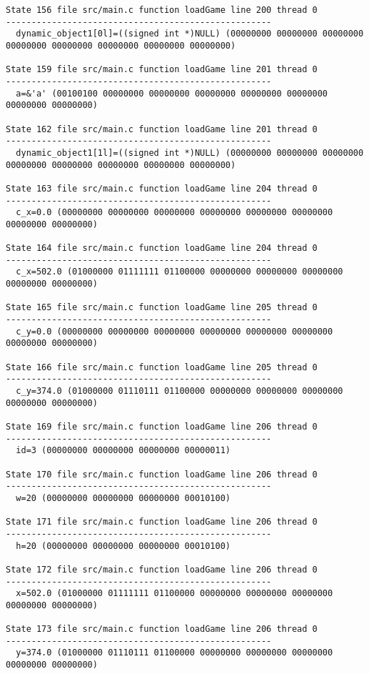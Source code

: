 \begin{verbatim}
State 156 file src/main.c function loadGame line 200 thread 0
----------------------------------------------------
  dynamic_object1[0l]=((signed int *)NULL) (00000000 00000000 00000000 00000000 00000000 00000000 00000000 00000000)

State 159 file src/main.c function loadGame line 201 thread 0
----------------------------------------------------
  a=&'a' (00100100 00000000 00000000 00000000 00000000 00000000 00000000 00000000)

State 162 file src/main.c function loadGame line 201 thread 0
----------------------------------------------------
  dynamic_object1[1l]=((signed int *)NULL) (00000000 00000000 00000000 00000000 00000000 00000000 00000000 00000000)

State 163 file src/main.c function loadGame line 204 thread 0
----------------------------------------------------
  c_x=0.0 (00000000 00000000 00000000 00000000 00000000 00000000 00000000 00000000)

State 164 file src/main.c function loadGame line 204 thread 0
----------------------------------------------------
  c_x=502.0 (01000000 01111111 01100000 00000000 00000000 00000000 00000000 00000000)

State 165 file src/main.c function loadGame line 205 thread 0
----------------------------------------------------
  c_y=0.0 (00000000 00000000 00000000 00000000 00000000 00000000 00000000 00000000)

State 166 file src/main.c function loadGame line 205 thread 0
----------------------------------------------------
  c_y=374.0 (01000000 01110111 01100000 00000000 00000000 00000000 00000000 00000000)

State 169 file src/main.c function loadGame line 206 thread 0
----------------------------------------------------
  id=3 (00000000 00000000 00000000 00000011)

State 170 file src/main.c function loadGame line 206 thread 0
----------------------------------------------------
  w=20 (00000000 00000000 00000000 00010100)

State 171 file src/main.c function loadGame line 206 thread 0
----------------------------------------------------
  h=20 (00000000 00000000 00000000 00010100)

State 172 file src/main.c function loadGame line 206 thread 0
----------------------------------------------------
  x=502.0 (01000000 01111111 01100000 00000000 00000000 00000000 00000000 00000000)

State 173 file src/main.c function loadGame line 206 thread 0
----------------------------------------------------
  y=374.0 (01000000 01110111 01100000 00000000 00000000 00000000 00000000 00000000)


\end{verbatim}
